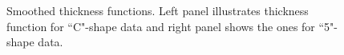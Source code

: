 \documentclass[12pt]{article}
\begin{document}
\begin{figure}[H]
\caption[Smoothed Thickness Function]{\footnotesize Smoothed thickness functions. Left panel illustrates thickness function for ``C"-shape data and right panel shows the ones for ``5"-shape data.}
\label{fig.thick}
\begin{minipage}[b]{0.5\linewidth}
\centering
{}
\end{minipage}
\hspace{0.2cm}
\begin{minipage}[b]{0.5\linewidth}
\centering
{}
\end{minipage}
\end{figure}
\end{document}
